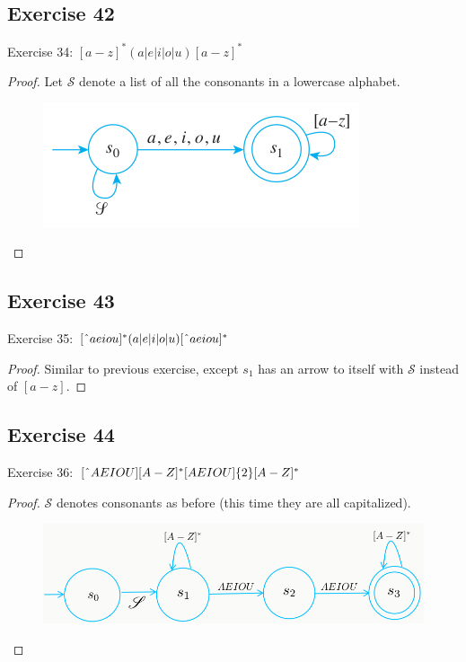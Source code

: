 \documentclass[14pt]{extarticle}
\begin{document}
\subsection{Exercise 42}
Exercise 34: \([a - z]^*(a | e | i | o | u)[a - z]^*\)
\begin{proof}
    Let \(\mathscr{S}\) denote a list of all the consonants in a lowercase alphabet.

    \begin{figure}[ht!]
        \centering
        \includegraphics[scale=0.5]{../images/12.2.42.png}
    \end{figure}
\end{proof}

\subsection{Exercise 43}
Exercise 35: \([\string^ aeiou]^*(a|e|i|o|u)[\string^ aeiou]^*\)
\begin{proof}
    Similar to previous exercise, except \(s_1\) has an arrow to itself with \(\mathscr{S}\) instead of \([a-z]\).
\end{proof}

\subsection{Exercise 44}
Exercise 36: \([\string^ AEIOU][A-Z]^*[AEIOU]\{2\}[A-Z]^*\)
\begin{proof}
    \(\mathscr{S}\) denotes consonants as before (this time they are all capitalized).
    \begin{figure}[ht!]
        \centering
        \includegraphics[scale=0.4]{../images/12.2.44.png}
    \end{figure}
\end{proof}
\end{document}
